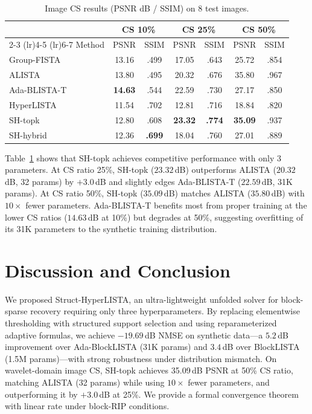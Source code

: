 \documentclass{article}
\begin{document}
\begin{table}[t]
\caption{Image CS results (PSNR dB / SSIM) on 8 test images.}
\label{tab:imagecs}
\centering
\small
\begin{tabular}{lcccccc}
\toprule
& \multicolumn{2}{c}{CS 10\%} & \multicolumn{2}{c}{CS 25\%} & \multicolumn{2}{c}{CS 50\%} \\
\cmidrule(lr){2-3} \cmidrule(lr){4-5} \cmidrule(lr){6-7}
Method & PSNR & SSIM & PSNR & SSIM & PSNR & SSIM \\
\midrule
Group-FISTA & 13.16 & .499 & 17.05 & .643 & 25.72 & .854 \\
ALISTA & 13.80 & .495 & 20.32 & .676 & 35.80 & .967 \\
Ada-BLISTA-T & \textbf{14.63} & .544 & 22.59 & .730 & 27.17 & .850 \\
HyperLISTA & 11.54 & .702 & 12.81 & .716 & 18.84 & .820 \\
SH-topk & 12.80 & .608 & \textbf{23.32} & \textbf{.774} & \textbf{35.09} & .937 \\
SH-hybrid & 12.36 & \textbf{.699} & 18.04 & .760 & 27.01 & .889 \\
\bottomrule
\end{tabular}
\end{table}

Table~\ref{tab:imagecs} shows that SH-topk achieves competitive performance with only 3 parameters. At CS ratio 25\%, SH-topk ($23.32$\,dB) outperforms ALISTA ($20.32$\,dB, 32 params) by $+3.0$\,dB and slightly edges Ada-BLISTA-T ($22.59$\,dB, 31K params). At CS ratio 50\%, SH-topk ($35.09$\,dB) matches ALISTA ($35.80$\,dB) with $10\times$ fewer parameters. Ada-BLISTA-T benefits most from proper training at the lower CS ratios ($14.63$\,dB at 10\%) but degrades at 50\%, suggesting overfitting of its 31K parameters to the synthetic training distribution.


\section{Discussion and Conclusion}

We proposed Struct-HyperLISTA, an ultra-lightweight unfolded solver for block-sparse recovery requiring only three hyperparameters. By replacing elementwise thresholding with structured support selection and using reparameterized adaptive formulas, we achieve $-19.69$\,dB NMSE on synthetic data---a $5.2$\,dB improvement over Ada-BlockLISTA (31K params) and $3.4$\,dB over BlockLISTA (1.5M params)---with strong robustness under distribution mismatch. On wavelet-domain image CS, SH-topk achieves 35.09\,dB PSNR at 50\% CS ratio, matching ALISTA (32 params) while using $10\times$ fewer parameters, and outperforming it by $+3.0$\,dB at 25\%. We provide a formal convergence theorem with linear rate under block-RIP conditions.
\end{document}
